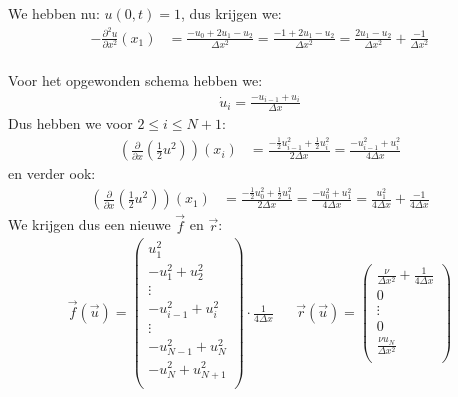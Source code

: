 \documentclass{article}
\begin{document}
We hebben nu: $u(0,t) = 1$, dus krijgen we:
\begin{align*}
-\frac{\partial^2 u}{\partial x^2}(x_1) &= \frac{-u_{0}+2u_1-u_{2}}{\Delta x^2}
= \frac{-1+2u_1-u_{2}}{\Delta x^2}
= \frac{2u_1-u_{2}}{\Delta x^2} +\frac{-1}{\Delta x^2}\\
\end{align*}

Voor het opgewonden schema hebben we:\begin{align*}
\dot{u}_{i} =\frac{-u_{i-1}+u_{i}}{\Delta x}
\end{align*}
Dus hebben we voor $2\leq i \leq N+1$:
\begin{align*}
\left(\frac{\partial}{\partial x}\left(\frac{1}{2}u^2\right)\right)(x_i) &= \frac{-\frac{1}{2}u_{i-1}^2+\frac{1}{2}u_{i}^2}{2\Delta x}
= \frac{-u_{i-1}^2+u_{i}^2}{4\Delta x}
\end{align*}
en verder ook:
\begin{align*}
\left(\frac{\partial}{\partial x}\left(\frac{1}{2}u^2\right)\right)(x_1) &= \frac{-\frac{1}{2}u_{0}^2+\frac{1}{2}u_{1}^2}{2\Delta x}
= \frac{-u_{0}^2+u_{1}^2}{4\Delta x}
=\frac{u_1^2}{4\Delta x} + \frac{-1}{4\Delta x}
\end{align*}
We krijgen dus een nieuwe $\vec{f}$ en $\vec{r}$:
\begin{align*}
\vec{f}(\vec{u}) = 
\begin{pmatrix}
u_1^2\\
-u_1^2 + u_2^2\\
\vdots\\
-u_{i-1}^2+u_{i}^2\\
\vdots\\
-u_{N-1}^2+u_{N}^2\\
-u_N^2+u_{N+1}^2\\
\end{pmatrix}
\cdot\frac{1}{4\Delta x} &&
\vec{r}(\vec{u}) = 
\begin{pmatrix}
\frac{\nu}{\Delta x^2} + \frac{1}{4\Delta x}\\
0\\
\vdots\\
0\\
\frac{\nu u_N}{\Delta x^2}\\
\end{pmatrix}
\end{align*}
\end{document}
